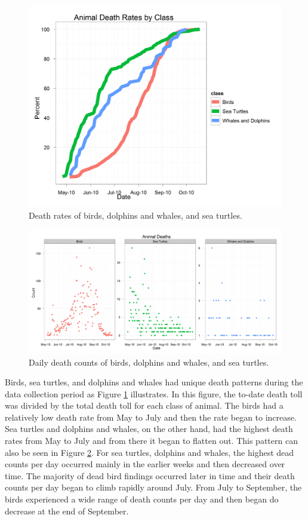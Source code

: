 \documentclass[11pt]{article}
\begin{document}
\begin{figure}[htbp] %
   \centering
   \includegraphics[width=5in]{death-rates.png} 
   \caption{Death rates of birds, dolphins and whales, and sea turtles. }
   \label{death rates}
\end{figure}

\begin{figure}[htbp] %
   \centering
   \includegraphics[width=5in]{daily-death-counts.png} 
   \caption{Daily death counts of birds, dolphins and whales, and sea turtles. }
   \label{daily-death-counts}
\end{figure}

Birds, sea turtles, and dolphins and whales had unique death patterns during the data collection period as Figure \ref {death rates}  illustrates. In this figure, the to-date death toll was divided by the total death toll for each class of animal. The birds had a relatively low death rate from May to July and then the rate began to increase. Sea turtles and dolphins and whales, on the other hand, had the highest death rates from May to July and from there it began to flatten out. This pattern can also be seen in Figure \ref {daily-death-counts}. For sea turtles, dolphins and whales, the highest dead counts per day occurred mainly in the earlier weeks and then decreased over time.  The majority of dead bird findings occurred later in time and their death counts per day began to climb rapidly around July. From July to September, the birds experienced a wide range of death counts per day and then began do decrease at the end of September.   
\end{document}
